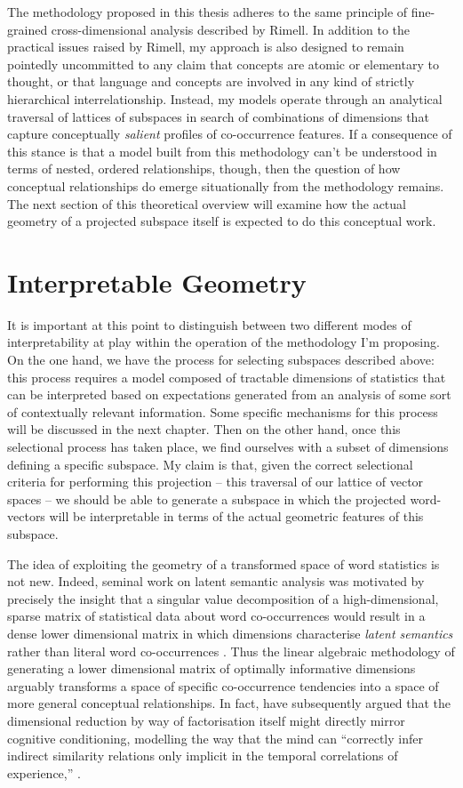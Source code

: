 The methodology proposed in this thesis adheres to the same principle of fine-grained cross-dimensional analysis described by Rimell.  In addition to the practical issues raised by Rimell, my approach is also designed to remain pointedly uncommitted to any claim that concepts are atomic or elementary to thought, or that language and concepts are involved in any kind of strictly hierarchical interrelationship.  Instead, my models operate through an analytical traversal of lattices of subspaces in search of combinations of dimensions that capture conceptually \emph{salient} profiles of co-occurrence features.  If a consequence of this stance is that a model built from this methodology can't be understood in terms of nested, ordered relationships, though, then the question of how conceptual relationships do emerge situationally from the methodology remains.  The next section of this theoretical overview will examine how the actual geometry of a projected subspace itself is expected to do this conceptual work.

\section{Interpretable Geometry} \label{sec:interpretable}
It is important at this point to distinguish between two different modes of interpretability at play within the operation of the methodology I'm proposing.  On the one hand, we have the process for selecting subspaces described above: this process requires a model composed of tractable dimensions of statistics that can be interpreted based on expectations generated from an analysis of some sort of contextually relevant information.  Some specific mechanisms for this process will be discussed in the next chapter.  Then on the other hand, once this selectional process has taken place, we find ourselves with a subset of dimensions defining a specific subspace.  My claim is that, given the correct selectional criteria for performing this projection -- this traversal of our lattice of vector spaces -- we should be able to generate a subspace in which the projected word-vectors will be interpretable in terms of the actual geometric features of this subspace.

The idea of exploiting the geometry of a transformed space of word statistics is not new.  Indeed, seminal work on latent semantic analysis was motivated by precisely the insight that a singular value decomposition of a high-dimensional, sparse matrix of statistical data about word co-occurrences would result in a dense lower dimensional matrix in which dimensions characterise \emph{latent semantics} rather than literal word co-occurrences \citep{DeerwesterEA1990}.  Thus the linear algebraic methodology of generating a lower dimensional matrix of optimally informative dimensions arguably transforms a space of specific co-occurrence tendencies into a space of more general conceptual relationships.  In fact, \citeauthor{LandauerEA1997} have subsequently argued that the dimensional reduction by way of factorisation itself might directly mirror cognitive conditioning, modelling the way that the mind can ``correctly infer indirect similarity relations only implicit in the temporal correlations of experience,'' \citep[][p. 212]{LandauerEA1997}.

